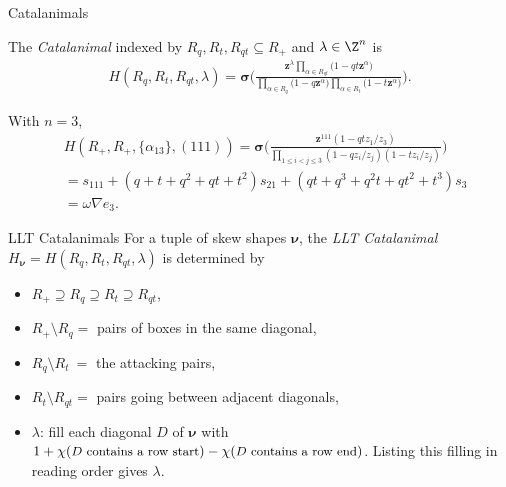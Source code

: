 \documentclass[dvipsnames]{beamer}
\newcommand{\zz}{{\boldsymbol z}}
\newcommand{\sigmabold}{\boldsymbol \sigma}
\newcommand{\nubold}{{\boldsymbol \nu }}
\theoremstyle{definition}
\begin{document}
\begin{frame}{Catalanimals}
  \begin{definition}
    The \emph{Catalanimal} indexed by $R_q, R_t, R_{qt} \subseteq R_+$
    and $\lambda \in \Z^n$ is \vspace{-.4mm}
    \begin{align*}
      H(R_q,R_t,R_{qt},\lambda)
      = \sigmabold
      \bigg(\frac{\zz ^\lambda \prod_{\alpha \in
      R_{qt}} \big(1-q  t \zz ^\alpha \big)} {\prod_{\alpha \in R_q} \big(1-q \zz ^\alpha\big)
      \prod_{\alpha \in R_t} \big(1-t \zz ^\alpha\big)} 
      \bigg).
    \end{align*}
  \end{definition}
  \pause
With  $n=3$,
\vspace{-3mm}
\begin{align*}
& \displaystyle H(R_+,R_+,\{\alpha_{13}\}, (111)) =
\sigmabold \Big( \frac{\zz^{111} (1 - q t z_{1} /z_3)}
{\prod_{1\le i < j \le 3}(1 - q z_{i}/ z_{j})(1 - t z_{i}/ z_{j})} \Big)  \\
&  = s_{111} + (q+t+q^2+qt+t^2)s_{21}+ (qt + q^3+ q^2t + qt^2+t^3)s_{3} \\
& = \omega \nabla e_3.
\end{align*}
\vspace{4mm}
\end{frame}
\begin{frame}{LLT Catalanimals}
  For a tuple of skew shapes $\nubold$, the \emph{LLT Catalanimal} $H_{\nubold} = H(R_q,R_t, R_{qt}, \lambda)$
is determined by
\vspace{1mm}
\begin{itemize}
\item $R_+ \supseteq R_q \supseteq R_t \supseteq R_{qt}$,
\item $R_+ \setminus R_q = $ pairs of boxes in the same diagonal,
\item $R_q \setminus R_t \ = $ the attacking pairs,
\item  $R_t \setminus R_{qt}  = $ pairs going between adjacent diagonals,
\item $\lambda$: fill each diagonal $D$ of $\nubold$ with
$1+\chi({\small \text{$D$ contains a row start}}) - \chi({\small \text{$D$ contains a row end}})$. \break
Listing this filling in reading order gives  $\lambda$.
\end{itemize}
\end{frame}
\end{document}
